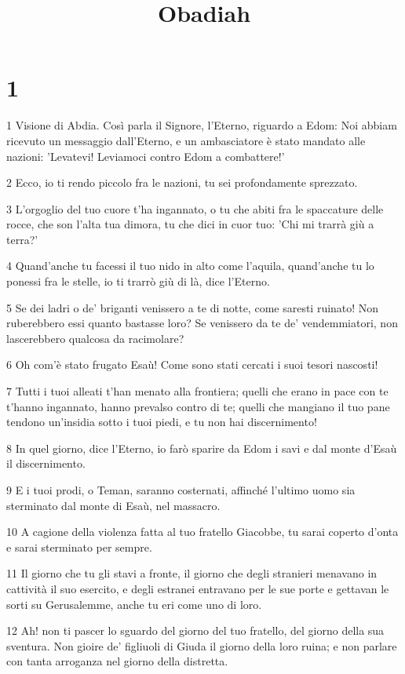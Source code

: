 

\title{Obadiah}


\chapter{1}

\par 1 Visione di Abdia. Così parla il Signore, l'Eterno, riguardo a Edom: Noi abbiam ricevuto un messaggio dall'Eterno, e un ambasciatore è stato mandato alle nazioni: 'Levatevi! Leviamoci contro Edom a combattere!'
\par 2 Ecco, io ti rendo piccolo fra le nazioni, tu sei profondamente sprezzato.
\par 3 L'orgoglio del tuo cuore t'ha ingannato, o tu che abiti fra le spaccature delle rocce, che son l'alta tua dimora, tu che dici in cuor tuo: 'Chi mi trarrà giù a terra?'
\par 4 Quand'anche tu facessi il tuo nido in alto come l'aquila, quand'anche tu lo ponessi fra le stelle, io ti trarrò giù di là, dice l'Eterno.
\par 5 Se dei ladri o de' briganti venissero a te di notte, come saresti ruinato! Non ruberebbero essi quanto bastasse loro? Se venissero da te de' vendemmiatori, non lascerebbero qualcosa da racimolare?
\par 6 Oh com'è stato frugato Esaù! Come sono stati cercati i suoi tesori nascosti!
\par 7 Tutti i tuoi alleati t'han menato alla frontiera; quelli che erano in pace con te t'hanno ingannato, hanno prevalso contro di te; quelli che mangiano il tuo pane tendono un'insidia sotto i tuoi piedi, e tu non hai discernimento!
\par 8 In quel giorno, dice l'Eterno, io farò sparire da Edom i savi e dal monte d'Esaù il discernimento.
\par 9 E i tuoi prodi, o Teman, saranno costernati, affinché l'ultimo uomo sia sterminato dal monte di Esaù, nel massacro.
\par 10 A cagione della violenza fatta al tuo fratello Giacobbe, tu sarai coperto d'onta e sarai sterminato per sempre.
\par 11 Il giorno che tu gli stavi a fronte, il giorno che degli stranieri menavano in cattività il suo esercito, e degli estranei entravano per le sue porte e gettavan le sorti su Gerusalemme, anche tu eri come uno di loro.
\par 12 Ah! non ti pascer lo sguardo del giorno del tuo fratello, del giorno della sua sventura. Non gioire de' figliuoli di Giuda il giorno della loro ruina; e non parlare con tanta arroganza nel giorno della distretta.
